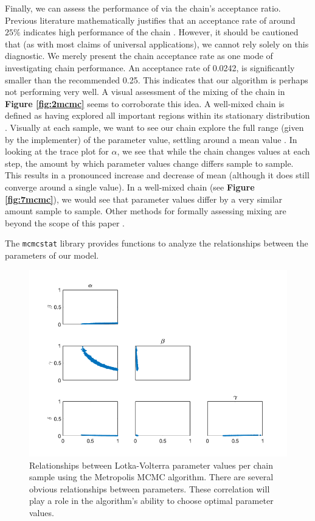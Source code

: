 \documentclass{article}
\begin{document}
\par Finally, we can assess the performance of via the chain's acceptance ratio. Previous literature mathematically justifies that an acceptance rate of around $25\%$ indicates high performance of the chain \cite{convergence} \cite{converge_threshold}. However, it should be cautioned that (as with most claims of universal applications), we cannot rely solely on this diagnostic. We merely present the chain acceptance rate as one mode of investigating chain performance. An acceptance rate of 0.0242, is significantly smaller than the recommended 0.25. This indicates that our algorithm is perhaps not performing very well. A visual assessment of the mixing of the chain in \textbf{Figure \ref{fig:2mcmc}} seems to corroborate this idea. A well-mixed chain is defined as having explored all important regions within its stationary distribution \cite{convergence_mixing}. Visually at each sample, we want to see our chain explore the full range (given by the implementer) of the parameter value, settling around a mean value \cite{convergence_ppt}. In looking at the trace plot for $\alpha$, we see that while the chain changes values at each step, the amount by which parameter values change differs sample to sample. This results in a pronounced increase and decrease of mean (although it does still converge around a single value). In a well-mixed chain (see \textbf{ Figure \ref{fig:7mcmc}}), we would see that parameter values differ by a very similar amount sample to sample.
Other methods for formally assessing mixing are beyond the scope of this paper \cite{convergence_mixing}.
\par The \texttt{mcmcstat} library provides functions to analyze the relationships between the parameters of our model.
\begin{figure}[H]
    \centering
    \includegraphics[width=15cm]{MCMC_figs/met_lv_final/final_mh_samples.png}
    \caption{Relationships between Lotka-Volterra parameter values per chain sample using the Metropolis MCMC algorithm. There are several obvious relationships between parameters. These correlation will play a role in the algorithm's ability to choose optimal parameter values.}
    \label{fig:3mcmc}
\end{figure}
\end{document}
